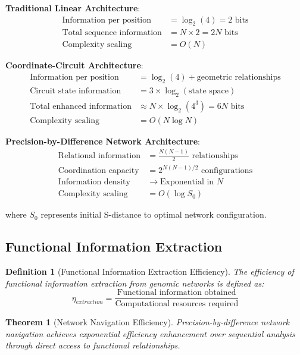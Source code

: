 \documentclass[12pt,a4paper]{article}
\newtheorem{theorem}{Theorem}
\newtheorem{definition}{Definition}
\begin{document}
\textbf{Traditional Linear Architecture}:
\begin{align}
\text{Information per position} &= \log_2(4) = 2 \text{ bits} \\
\text{Total sequence information} &= N \times 2 = 2N \text{ bits} \\
\text{Complexity scaling} &= O(N)
\end{align}

\textbf{Coordinate-Circuit Architecture}:
\begin{align}
\text{Information per position} &= \log_2(4) + \text{geometric relationships} \\
\text{Circuit state information} &= 3 \times \log_2(\text{state space}) \\
\text{Total enhanced information} &\approx N \times \log_2(4^3) = 6N \text{ bits} \\
\text{Complexity scaling} &= O(N \log N)
\end{align}

\textbf{Precision-by-Difference Network Architecture}:
\begin{align}
\text{Relational information} &= \frac{N(N-1)}{2} \text{ relationships} \\
\text{Coordination capacity} &= 2^{N(N-1)/2} \text{ configurations} \\
\text{Information density} &\rightarrow \text{Exponential in } N \\
\text{Complexity scaling} &= O(\log S_0)
\end{align}

where $S_0$ represents initial S-distance to optimal network configuration.

\subsection{Functional Information Extraction}

\begin{definition}[Functional Information Extraction Efficiency]
The efficiency of functional information extraction from genomic networks is defined as:
\begin{equation}
\eta_{extraction} = \frac{\text{Functional information obtained}}{\text{Computational resources required}}
\end{equation}
\end{definition}

\begin{theorem}[Network Navigation Efficiency]
Precision-by-difference network navigation achieves exponential efficiency enhancement over sequential analysis through direct access to functional relationships.
\end{theorem}
\end{document}
